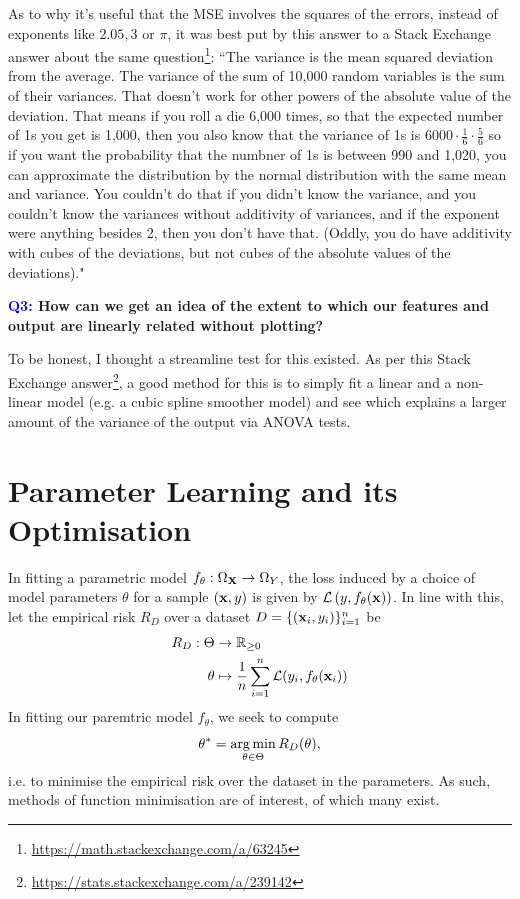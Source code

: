 \documentclass[11pt]{article}
\begin{document}
As to why it's useful that the MSE involves the squares of the errors, instead of exponents like $2.05, 3$ or $\pi$, it was best put by this answer to a Stack Exchange answer about the same question\footnote{\url{https://math.stackexchange.com/a/63245}}: ``The variance is the mean squared deviation from the average. The variance of the sum of 10,000 random variables is the sum of their variances. That doesn't work for other powers of the absolute value of the deviation. That means if you roll a die 6,000 times, so that the expected number of 1s you get is 1,000, then you also know that the variance of 1s is $6000\cdot\frac{1}{6}\cdot\frac{5}{6}$ so if you want the probability that the numbner of 1s is between 990 and 1,020, you can approximate the distribution by the normal distribution with the same mean and variance. You couldn't do that if you didn't know the variance, and you couldn't know the variances without additivity of variances, and if the exponent were anything besides 2, then you don't have that. (Oddly, you do have additivity with cubes of the deviations, but not cubes of the absolute values of the deviations)."

\begin{center}
    \textbf{\textcolor{blue}{Q3:} How can we get an idea of the extent to which our features and output are linearly related without plotting?}
\end{center}
To be honest, I thought a streamline test for this existed. As per this Stack Exchange answer\footnote{\url{https://stats.stackexchange.com/a/239142}}, a good method for this is to simply fit a linear and a non-linear model (e.g. a cubic spline smoother model) and see which explains a larger amount of the variance of the output via ANOVA tests.

\section{Parameter Learning and its Optimisation}
In fitting a parametric model $f_{\theta}:\Omega_{\mathbf{X}}\to\Omega_{Y}$, the loss induced by a choice of model parameters $\theta$ for a sample $(\mathbf{x},y)$ is given by $\mathcal{L}\left(y,f_{\theta}(\mathbf{x})\right)$. In line with this, let the empirical risk $R_D$ over a dataset $D=\{(\mathbf{x}_i,y_i)\}_{i=1}^n$ be
\begin{align*}
    R_D:\Theta&\to\mathbb{R}_{\geq0}\\
    \theta&\mapsto\frac{1}{n}\sum_{i=1}^n\mathcal{L}(y_i,f_{\theta}(\mathbf{x}_i))
\end{align*}
In fitting our paremtric model $f_{\theta}$, we seek to compute
$$
\theta^{*}
=
\operatorname*{arg\,min}_{\theta\in\Theta}R_D(\theta),
$$
i.e. to minimise the empirical risk over the dataset in the parameters. As such, methods of function minimisation are of interest, of which many exist.
\end{document}
